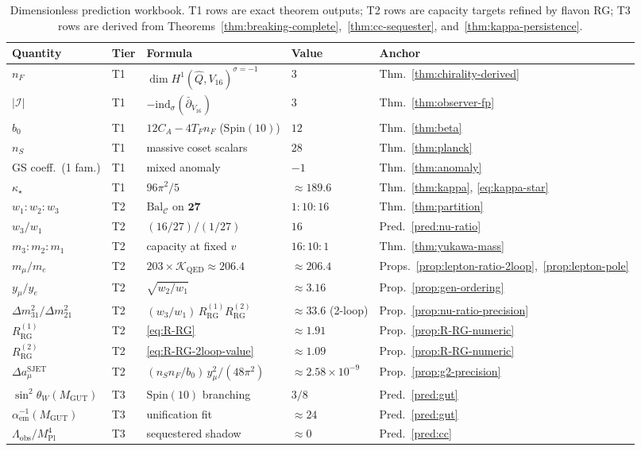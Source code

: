 \documentclass[aps,prd,onecolumn,amsmath,amssymb,nofootinbib,11pt]{revtex4-2}
\numberwithin{equation}{section}
\theoremstyle{plain}
\theoremstyle{definition}
\theoremstyle{remark}
\newcommand{\Spin}{\mathrm{Spin}}
\newcommand{\MPl}{M_{\mathrm{Pl}}}
\begin{document}
\begin{table}[ht]
\centering
\small
\renewcommand{\arraystretch}{1.14}
\begin{tabular}{@{}lllll@{}}
\toprule
\textbf{Quantity} & \textbf{Tier} & \textbf{Formula} & \textbf{Value} &
\textbf{Anchor} \\
\midrule
$n_F$ & T1 & $\dim H^1(\hat Q,V_{16})^{\sigma=-1}$ & $3$ &
Thm.~\ref{thm:chirality-derived} \\
$|\mathcal{I}|$ & T1 & $-\mathrm{ind}_\sigma(\bar\partial_{V_{16}})$ & $3$ &
Thm.~\ref{thm:observer-fp} \\
$b_0$ & T1 & $12C_A-4T_Fn_F$ ($\Spin(10)$) & $12$ &
Thm.~\ref{thm:beta} \\
$n_S$ & T1 & massive coset scalars & $28$ &
Thm.~\ref{thm:planck} \\
GS coeff.\ (1 fam.) & T1 & mixed anomaly & $-1$ &
Thm.~\ref{thm:anomaly} \\
$\kappa_\star$ & T1 & $96\pi^2/5$ & $\approx 189.6$ &
Thm.~\ref{thm:kappa}, \eqref{eq:kappa-star} \\
$w_1:w_2:w_3$ & T2 & $\mathrm{Bal}_{\mathcal{C}}$ on $\mathbf{27}$ &
$1:10:16$ &
Thm.~\ref{thm:partition} \\
$w_3/w_1$ & T2 & $(16/27)/(1/27)$ & $16$ &
Pred.~\ref{pred:nu-ratio} \\
$m_3:m_2:m_1$ & T2 & capacity at fixed $v$ & $16:10:1$ &
Thm.~\ref{thm:yukawa-mass} \\
$m_\mu/m_e$ & T2 & $203\times\mathcal{K}_{\mathrm{QED}}\approx206.4$ &
$\approx 206.4$ &
Props.~\ref{prop:lepton-ratio-2loop},~\ref{prop:lepton-pole} \\
$y_\mu/y_e$ & T2 & $\sqrt{w_2/w_1}$ & $\approx 3.16$ &
Prop.~\ref{prop:gen-ordering} \\
$\Delta m^2_{31}/\Delta m^2_{21}$ & T2 &
$(w_3/w_1)\,R_{\mathrm{RG}}^{(1)}R_{\mathrm{RG}}^{(2)}$ &
$\approx 33.6$ (2-loop) &
Prop.~\ref{prop:nu-ratio-precision} \\
$R_{\mathrm{RG}}^{(1)}$ & T2 & \eqref{eq:R-RG} & $\approx 1.91$ &
Prop.~\ref{prop:R-RG-numeric} \\
$R_{\mathrm{RG}}^{(2)}$ & T2 & \eqref{eq:R-RG-2loop-value} & $\approx 1.09$ &
Prop.~\ref{prop:R-RG-numeric} \\
$\Delta a_\mu^{\mathrm{SJET}}$ & T2 &
$(n_S n_F/b_0)\,y_\mu^2/(48\pi^2)$ &
$\approx 2.58\times10^{-9}$ &
Prop.~\ref{prop:g2-precision} \\
$\sin^2\theta_W(M_{\mathrm{GUT}})$ & T3 & $\Spin(10)$ branching & $3/8$ &
Pred.~\ref{pred:gut} \\
$\alpha_{\mathrm{em}}^{-1}(M_{\mathrm{GUT}})$ & T3 & unification fit &
$\approx 24$ &
Pred.~\ref{pred:gut} \\
$\Lambda_{\mathrm{obs}}/\MPl^4$ & T3 & sequestered shadow &
$\approx 0$ &
Pred.~\ref{pred:cc} \\
\bottomrule
\end{tabular}
\caption{Dimensionless prediction workbook. T1 rows are exact theorem outputs;
T2 rows are capacity targets refined by flavon RG; T3 rows are derived from
Theorems~\ref{thm:breaking-complete},~\ref{thm:cc-sequester},
and~\ref{thm:kappa-persistence}.}
\label{tab:numerical-workbook}
\end{table}
\end{document}
